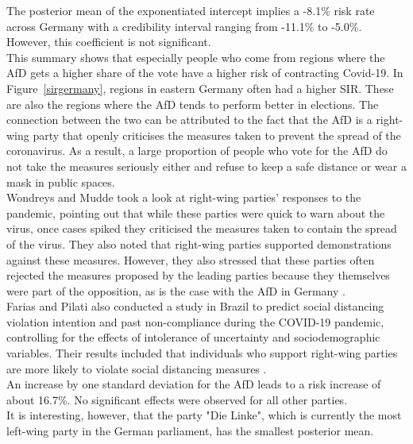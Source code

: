 The posterior mean of the exponentiated intercept implies a -8.1\% risk rate across Germany with a credibility interval ranging from -11.1\% to -5.0\%. However, this coefficient is not significant. \\
This summary shows that especially people who come from regions where the AfD gets a higher share of the vote have a higher risk of contracting Covid-19. In Figure~\ref{sirgermany}, regions in eastern Germany often had a higher SIR. These are also the regions where the AfD tends to perform better in elections. The connection between the two can be attributed to the fact that the AfD is a right-wing party that openly criticises the measures taken to prevent the spread of the coronavirus. As a result, a large proportion of people who vote for the AfD do not take the measures seriously either and refuse to keep a safe distance or wear a mask in public spaces. \\
Wondreys and Mudde took a look at right-wing parties' responses to the pandemic, pointing out that while these parties were quick to warn about the virus, once cases spiked they criticised the measures taken to contain the spread of the virus. They also noted that right-wing parties supported demonstrations against these measures. However, they also stressed that these parties often rejected the measures proposed by the leading parties because they themselves were part of the opposition, as is the case with the AfD in Germany \cite{wondreys2020victims}.  \\
Farias and Pilati also conducted a study in Brazil to predict social distancing violation intention and past non-compliance during the COVID-19 pandemic, controlling for the effects of intolerance of uncertainty and sociodemographic variables. Their results included that individuals who support right-wing parties are more likely to violate social distancing measures \cite{farias2020violating}. \\
An increase by one standard deviation for the AfD leads to a risk increase of about 16.7\%. No significant effects were observed for all other parties. \\
It is interesting, however, that the party "Die Linke", which is currently the most left-wing party in the German parliament, has the smallest posterior mean. \\
